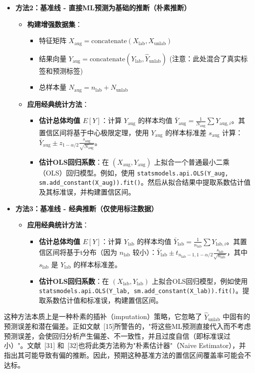 \documentclass[12pt,a4paper]{article}
\begin{document}
\begin{itemize}
    \item \textbf{方法2：基准线 - 直接ML预测为基础的推断（朴素推断）}
    \begin{itemize}
        \item \textbf{构建增强数据集}：
        \begin{itemize}
            \item 特征矩阵 $X_{\text{aug}} = \text{concatenate}(X_{\text{lab}}, X_{\text{unlab}})$
            \item 结果向量 $Y_{\text{aug}} = \text{concatenate}(Y_{\text{lab}}, \hat{Y}_{\text{unlab}})$ (注意：此处混合了真实标签和预测标签)
            \item 总样本量 $N_{\text{aug}} = n_{\text{lab}} + N_{\text{unlab}}$
        \end{itemize}
        \item \textbf{应用经典统计方法}：
        \begin{itemize}
            \item \textbf{估计总体均值 $E[Y]$}：计算 $Y_{\text{aug}}$ 的样本均值 $\bar{Y}_{\text{aug}} = \frac{1}{N_{\text{aug}}} \sum Y_{\text{aug},i}$。其置信区间将基于中心极限定理，使用 $Y_{\text{aug}}$ 的样本标准差 $s_{\text{aug}}$ 计算：$\bar{Y}_{\text{aug}} \pm z_{1-\alpha/2} \frac{s_{\text{aug}}}{\sqrt{N_{\text{aug}}}}$。
            \item \textbf{估计OLS回归系数}：在 $(X_{\text{aug}},Y_{\text{aug}})$ 上拟合一个普通最小二乘（OLS）回归模型。例如，使用 \texttt{statsmodels.api.OLS(Y\_aug, sm.add\_constant(X\_aug)).fit()}。然后从拟合结果中提取系数估计值及其标准误，并构建置信区间。
        \end{itemize}
    \end{itemize}

    \item \textbf{方法3：基准线 - 经典推断（仅使用标注数据）}
    \begin{itemize}
        \item \textbf{应用经典统计方法}：
        \begin{itemize}
            \item \textbf{估计总体均值 $E[Y]$}：计算 $Y_{\text{lab}}$ 的样本均值 $\bar{Y}_{\text{lab}} = \frac{1}{n_{\text{lab}}} \sum Y_{\text{lab},i}$。其置信区间将基于t分布（因为 $n_{\text{lab}}$ 较小）：$\bar{Y}_{\text{lab}} \pm t_{n_{\text{lab}}-1,1-\alpha/2} \frac{s_{\text{lab}}}{\sqrt{n_{\text{lab}}}}$，其中 $s_{\text{lab}}$ 是 $Y_{\text{lab}}$ 的样本标准差。
            \item \textbf{估计OLS回归系数}：在 $(X_{\text{lab}},Y_{\text{lab}})$ 上拟合OLS回归模型，例如使用 \texttt{statsmodels.api.OLS(Y\_lab, sm.add\_constant(X\_lab)).fit()}。提取系数估计值和标准误，构建置信区间。
        \end{itemize}
    \end{itemize}
\end{itemize}
这种方法本质上是一种朴素的插补（imputation）策略，它忽略了 $\hat{Y}_{\text{unlab}}$ 中固有的预测误差和潜在偏差。正如文献~{[15]}所警告的，"将这些ML预测直接代入而不考虑预测误差，会使回归分析产生偏差、不一致性，并且过度自信（即标准误过小）"。文献~{[31]} 和~{[32]}也将此类方法称为"朴素估计器"（Naive Estimator），并指出其可能导致有偏的推断。因此，预期这种基准方法的置信区间覆盖率可能会不达标。
\end{document}
